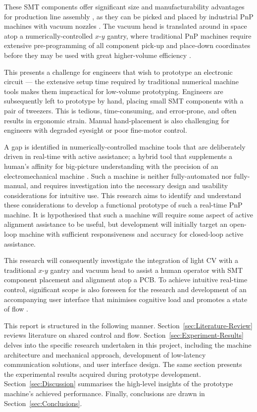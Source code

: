 \documentclass[12pt,british,UKenglish]{article}
\begin{document}
These \ac{SMT} components offer significant size and manufacturability advantages for production line assembly \cite{17578981}, as they can be picked and placed by industrial \ac{PnP} machines with vacuum nozzles \cite{09540911}.
The vacuum head is translated around in space atop a numerically-controlled $x$-$y$ gantry, where traditional \ac{PnP} machines require extensive pre-programming of all component pick-up and place-down coordinates before they may be used with great higher-volume efficiency \cite{10.1111/j.1937-5956.2005.tb00019.x,AYOB2008893}.

This presents a challenge for engineers that wish to prototype an electronic circuit ---
the extensive setup time required by traditional numerical machine tools makes them impractical for low-volume prototyping.
Engineers are subsequently left to prototype by hand, placing small \ac{SMT} components with a pair of tweezers.
This is tedious, time-consuming, and error-prone, and often results in ergonomic strain.
Manual hand-placement is also challenging for engineers with degraded eyesight or poor fine-motor control.

A gap is identified in numerically-controlled machine tools that are deliberately driven in real-time with active assistance; a hybrid tool that supplements a human's affinity for big-picture understanding with the precision of an electromechanical machine \cite{10.1109/TRO.2015.2419873}.
Such a machine is neither fully-automated nor fully-manual, and requires investigation into the necessary design and usability considerations for intuitive use.
This research aims to identify and understand these considerations to develop a functional prototype of such a real-time \ac{PnP} machine.
It is hypothesised that such a machine will require some aspect of active alignment assistance to be useful, but development will initially target an open-loop machine with sufficient responsiveness and accuracy for closed-loop active assistance.

This research will consequently investigate the integration of light \ac{CV} with a traditional $x$-$y$ gantry and vacuum head to assist a human operator with \ac{SMT} component placement and alignment atop a \ac{PCB}.
To achieve intuitive real-time control, significant scope is also foreseen for the research and development of an accompanying user interface that minimises cognitive load and promotes a state of flow \cite{10.3389/fpsyg.2022.815665}.

This report is structured in the following manner.
Section~\ref{sec:Literature-Review} reviews literature on shared control and flow.
Section~\ref{sec:Experiment-Results} delves into the specific research undertaken in this project, including the machine architecture and mechanical approach, development of low-latency communication solutions, and user interface design.
The same section presents the experimental results acquired during prototype development.
Section~\ref{sec:Discussion} summarises the high-level insights of the prototype machine's achieved performance.
Finally, conclusions are drawn in Section~\ref{sec:Conclusions}.
\end{document}

